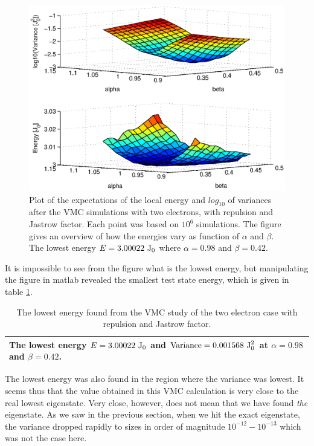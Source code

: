 \begin{figure}[h!]
	\centering
	\includegraphics[width=\textwidth]{results/N2_rep.eps}
	\caption{Plot of the expectations of the local energy and $log_{10}$ of variances after the VMC simulations with two electrons, with repulsion and Jastrow factor. 
	Each point was based on $10^6$ simulations. 
	The figure gives an overview of how the energies vary as function of $\alpha$ and $\beta$.
	The lowest energy $E= 3.00022 ~\textrm{J}_0$ where $\alpha = 0.98$ and $\beta = 0.42$.}
	\label{fig:N2_rep}
\end{figure}

It is impossible to see from the figure what is the lowest energy, but manipulating the figure in matlab revealed the smallest test state energy, which is given in table \ref{tab:N2_rep}.

\begin{table}[h!]
		\centering 
	\begin{tabular}{l}
		\toprule
		The lowest energy $E=3.00022 ~\textrm{J}_0$ and $\textrm{Variance} = 0.001568 ~\textrm{J}_0^2$ at $\alpha = 0.98$ and $\beta = 0.42$. \\
		\bottomrule
	\end{tabular}
	\caption{The lowest energy found from the VMC study of the two electron case with repulsion and Jastrow factor.}
	\label{tab:N2_rep}
\end{table}

The lowest energy was also found in the region where the variance was lowest. 
It seems thus that the value obtained in this VMC calculation is very close to the real lowest eigenstate. 
Very close, however, does not mean that we have found \textit{the} eigenstate. 
As we saw in the previous section, when we hit the exact eigenstate, the variance dropped rapidly to sizes in order of magnitude $10^{-12}-10^{-13}$ which was not the case here. 




